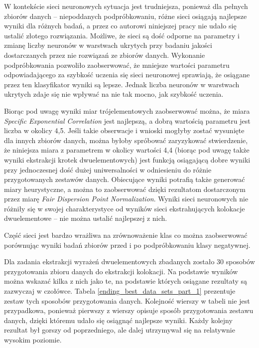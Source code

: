 \documentclass[11pt,a4paper]{llncs}
\begin{document}
W kontekście sieci neuronowych sytuacja jest trudniejsza, ponieważ dla pełnych zbiorów danych -- niepoddanych podpróbkowaniu, różne sieci osiągają najlepsze wyniki dla różnych badań, a przez co autorowi niniejszej pracy nie udało się ustalić złotego rozwiązania.
Możliwe, że sieci są dość odporne na parametry i zmianę liczby neuronów w warstwach ukrytych przy badaniu jakości dostarczanych przez nie rozwiązań ze zbiorów danych.
Wykonanie podpróbkowania pozwoliło zaobserwować, że mniejsze wartości parametru odpowiadającego za szybkość uczenia się sieci neuronowej sprawiają, że osiągane przez ten klasyfikator wyniki są lepsze.
Jednak liczba neuronów w warstwach ukrytych zdaje się nie wpływać na nie tak mocno, jak szybkość uczenia.

\par
Biorąc pod uwagę wyniki miar trójelementowych zaobserwować można, że miara \emph{Specific Exponential Correlation} jest najlepszą, a dobrą wartością parametru jest liczba w okolicy 4,5.
Jeśli takie obserwacje i wnioski mogłyby zostać wysunięte dla innych zbiorów danych, można byłoby spróbować zaryzykować stwierdzenie, że niniejsza miara z parametrem w okolicy wartości 4,4 (biorąc pod uwagę także wyniki ekstrakcji krotek dwuelementowych) jest funkcją osiągającą dobre wyniki przy jednoczesnej dość dużej uniwersalności w odniesieniu do różnie przygotowanych zestawów danych.
Obiecujące wyniki potrafią także generować miary heurystyczne, a można to zaobserwować dzięki rezultatom dostarczonym przez miarę \emph{Fair Dispersion Point Normalization}.
Wyniki sieci neuronowych nie różniły się w swojej charakterystyce od wyników sieci ekstrahujących kolokacje dwuelementowe -- nie można ustalić najlepszej z nich.

\par
Część sieci jest bardzo wrażliwa na zrównoważenie klas co można zaobserwować porównując wyniki badań zbiorów przed i po podpróbkowaniu klasy negatywnej.

\par
Dla zadania ekstrakcji wyrażeń dwuelementowych zbadanych zostało 30 sposobów przygotowania zbioru danych do ekstrakcji kolokacji.
Na podstawie wyników można wskazać kilka z nich jako te, na podstawie których osiągane rezultaty są zazwyczaj w czołówce.
Tabela \ref{ending_best_data_sets_part_1} prezentuje zestaw tych sposobów przygotowania danych.
Kolejność wierszy w tabeli nie jest przypadkowa, ponieważ pierwszy z wierszy opisuje sposób przygotowania zestawu danych, dzięki któremu udało się osiągnąć najlepsze wyniki.
Każdy kolejny rezultat był gorszy od poprzedniego, ale dalej utrzymywał się na relatywnie wysokim poziomie.
\end{document}
